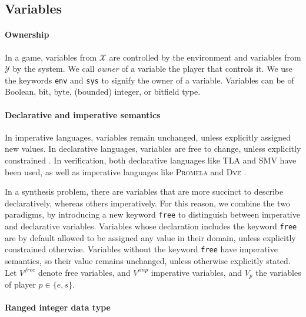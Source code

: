\documentclass[copyright]{eptcs}
\begin{document}
\subsection{Variables}
\label{sec:variables}


\paragraph{Ownership}

In a game, variables from $\mathcal{X}$ are controlled by the environment and variables from $\mathcal{Y}$ by the system.
We call {\em owner} of a variable the player that controls it.
We use the keywords \texttt{env} and \texttt{sys} to signify the owner of a variable.
Variables can be of Boolean, bit, byte, (bounded) integer, or bitfield type.


\paragraph{Declarative and imperative semantics}

In imperative languages, variables remain unchanged, unless explicitly assigned new values.
In declarative languages, variables are free to change, unless explicitly constrained \cite{vanRoy04}.
In verification, both declarative languages like \textsc{TLA} \cite{Lamport02} and \textsc{SMV} \cite{Cavada10nusmv} have been used, as well as imperative languages like \textsc{Promela} and \textsc{Dve} \cite{Barnat13cav}.

In a synthesis problem, there are variables that are more succinct to describe declaratively, whereas others imperatively.
For this reason, we combine the two paradigms, by introducing a new keyword \texttt{free} to distinguish between imperative and declarative variables.
Variables whose declaration includes the keyword \texttt{free} are by default allowed to be assigned any value in their domain, unless explicitly constrained otherwise.
Variables without the keyword \texttt{free} have imperative semantics, so their value remains unchanged, unless otherwise explicitly stated.
Let $V^{free}$ denote free variables, and $V^{imp}$ imperative variables, and $V_p$ the variables of player $p \in \{e, s\}$.


\paragraph{Ranged integer data type}
\end{document}

